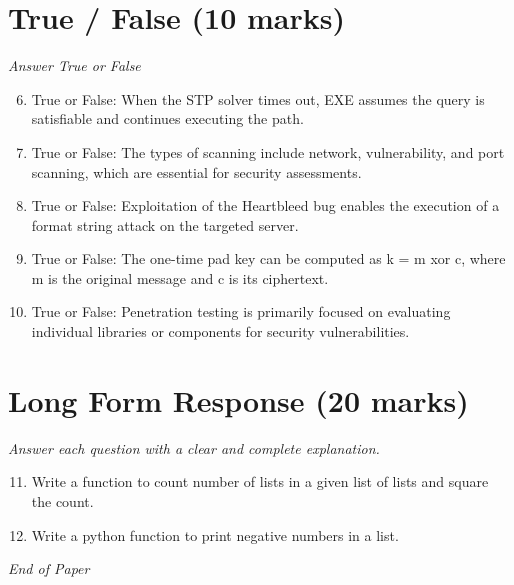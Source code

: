 \documentclass[12pt]{article}
\begin{document}
\section*{True / False (10 marks)}
\textit{Answer True or False}
\begin{enumerate}[label=\arabic*.]
\setcounter{enumi}{5}
\item True or False: When the STP solver times out, EXE assumes the query is satisfiable and continues executing the path.
\item True or False: The types of scanning include network, vulnerability, and port scanning, which are essential for security assessments.
\item True or False: Exploitation of the Heartbleed bug enables the execution of a format string attack on the targeted server.
\item True or False: The one-time pad key can be computed as k = m xor c, where m is the original message and c is its ciphertext.
\item True or False: Penetration testing is primarily focused on evaluating individual libraries or components for security vulnerabilities.
\end{enumerate}

\section*{Long Form Response (20 marks)}
\textit{Answer each question with a clear and complete explanation.}
\begin{enumerate}[label=\arabic*.]
\setcounter{enumi}{10}
\item Write a function to count number of lists in a given list of lists and square the count.
\item Write a python function to print negative numbers in a list.
\end{enumerate}

\vfill
\noindent\textit{End of Paper}
\end{document}
